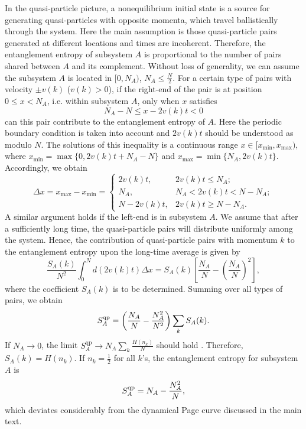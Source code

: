 \documentclass[aps,onecolumn,nofootinbib,superscriptaddress,notitlepage,longbibliography]{revtex4-1}
\begin{document}
In the quasi-particle picture, a nonequilibrium %
initial state is a source for generating quasi-particles
with opposite momenta, which travel ballistically through the system.
Here the main assumption is %
 those quasi-particle pairs generated %
at different locations and times are incoherent. Therefore, the entanglement entropy
of subsystem $A$ is proportional to the number of pairs shared between
$A$ and its complement. Without loss of generality, we can assume
the subsystem $A$ is located in $[0,N_{A})$, $N_{A}\leq\frac{N}{2}$.
For a certain type of pairs with velocity $\pm v(k)$ ($v(k)>0$),
if the right-end of the pair is at position $0\leq x<N_{A}$, i.e.
within subsystem $A$, only when $x$ satisfies
\[
N_{A}-N\leq x-2v(k)t<0
\]
can this pair contribute to the entanglement entropy of $A$. Here the periodic
boundary condition is taken into account and $2v(k)t$ should be understood
as modulo $N$. The solutions of this inequality is a continuous range
$x\in[x_{\mathrm{min}},x_{\mathrm{max}})$, where $x_{\mathrm{min}}=\max\{0,2v(k)t+N_{A}-N\}$ and 
$x_{\mathrm{max}}=\min\{N_{A},2v(k)t\}$. Accordingly, we obtain
\[
\Delta x=x_{\mathrm{max}}-x_{\mathrm{min}}=\begin{cases}
2v(k)t, & 2v(k)t\leq N_{A};\\
N_{A}, & N_{A}<2v(k)t<N-N_{A};\\
N-2v(k)t, & 2v(k)t\geq N-N_{A}.
\end{cases}
\]
A similar argument holds if the left-end is in subsystem $A$. We
assume that after a sufficiently long %
time, the quasi-particle pairs will distribute
uniformly among the system. Hence, %
the contribution of %
quasi-particle pairs with momentum $k$ to the entanglement entropy upon the long-time average is given by %
\[
\frac{S_{A}(k)}{N^{2}}\int_{0}^{N}d(2v(k)t)\Delta x=S_{A}(k)\left[\frac{N_{A}}{N}-\left(\frac{N_{A}}{N}\right)^{2}\right],
\]
where the coefficient $S_A(k)$ is to be determined. Summing over all types of pairs, we obtain 
\[
S^{\rm qp}_{A}=\left(\frac{N_{A}}{N}-\frac{N_{A}^{2}}{N^{2}}\right)\sum_{k}S_{A}(k).
\]
If $N_{A}\to0$, the limit $S_{A}^\mathrm{qp}\to N_{A}\sum_{k}\frac{H(n_{k})}{N}$
should hold \citep{Alba2018}. Therefore, $S_{A}(k)=H(n_{k})$. If
$n_{k}=\frac{1}{2}$ for all $k$'s, the entanglement entropy for subsystem
$A$ is
\[
S^{\rm qp}_{A}=N_{A}-\frac{N_{A}^{2}}{N},
\]
which deviates considerably from %
the dynamical Page curve %
discussed in the main text.
\end{document}
